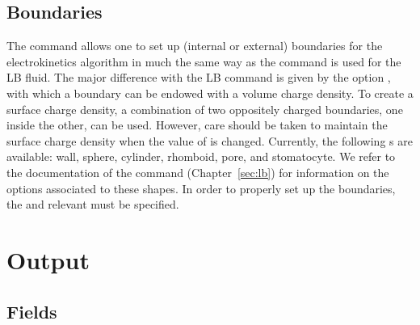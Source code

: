 \subsection{\label{ssec:ek-boundaries}Boundaries}

\begin{essyntax}
  \begin{features}
  \end{features}
\end{essyntax}
The  command allows one to set up (internal or external) boundaries
for the electrokinetics algorithm in much the same way as the  
command is used for the LB fluid. The major difference with the LB command is 
given by the option , with which a boundary can be endowed 
with a volume charge density. To create a surface charge density, a combination 
of two oppositely charged boundaries, one inside the other, can be used. 
However, care should be taken to maintain the surface charge density when the
value of  is changed. Currently, the following s are 
available: wall, sphere, cylinder, rhomboid, pore, and stomatocyte. We refer to 
the documentation of the  command (Chapter~\ref{sec:lb}) for
information on the options  associated to these shapes. In
order to properly set up the boundaries, the  and relevant
 must be specified.

\section{\label{ssec:ek-output}Output}

\subsection{\label{ssec:ek-output-fields}Fields}

